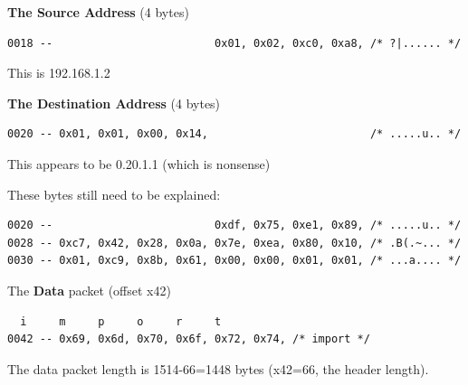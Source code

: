\vspace{1mm}
\noindent
{\bf The Source Address} (4 bytes)
\begin{verbatim}
0018 --                         0x01, 0x02, 0xc0, 0xa8, /* ?|...... */
\end{verbatim}
This is 192.168.1.2

\vspace{1mm}
\noindent
{\bf The Destination Address} (4 bytes)
\begin{verbatim}
0020 -- 0x01, 0x01, 0x00, 0x14,                         /* .....u.. */
\end{verbatim}
This appears to be 0.20.1.1 (which is nonsense)

\vspace{1mm}
\noindent
These bytes still need to be explained:
\begin{verbatim}
0020 --                         0xdf, 0x75, 0xe1, 0x89, /* .....u.. */
0028 -- 0xc7, 0x42, 0x28, 0x0a, 0x7e, 0xea, 0x80, 0x10, /* .B(.~... */
0030 -- 0x01, 0xc9, 0x8b, 0x61, 0x00, 0x00, 0x01, 0x01, /* ...a.... */
\end{verbatim}

\vspace{1mm}
\noindent
The {\bf Data} packet (offset x42)
\begin{verbatim}
  i     m     p     o     r     t
0042 -- 0x69, 0x6d, 0x70, 0x6f, 0x72, 0x74, /* import */
\end{verbatim}
The data packet length is 1514-66=1448 bytes (x42=66, the header length).

